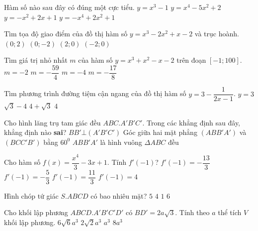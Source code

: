 \begin{ex}%
Hàm số nào sau đây có đúng một cực tiểu.
\choice
{\True$y=x^3-1$}
{$y=x^4-5x^2+2$}
{$y=-x^2+2x+1$}
{$y=-x^4+2x^2+1$}
\end{ex} 
\begin{ex}%
Tìm tọa độ giao điểm của đồ thị hàm số $y=x^3-2x^2+x-2$ và trục hoành.
\choice
{$(0;2)$}
{$(0;-2)$}
{\True$(2;0)$}
{$(-2;0)$}
\end{ex} 
\begin{ex}%
Tìm giá trị nhỏ nhất $m$ của hàm số $y=x^3+x^2-x-2$ trên đoạn $\left[ { - 1;100} \right]$.
\choice
{$m=-2$}
{\True$m=-\dfrac{59}{4}$}
{$m=-4$}
{$m=-\dfrac{17}{8}$}
\end{ex} 
\begin{ex}%
Tìm phương trình đường tiệm cận ngang của đồ thị hàm số $y=3-\dfrac{1}{2x-1}$.
\choice
{\True$y=3$}
{$\sqrt{3}-4$}
{$4+\sqrt{3}$}
{$4$}
\end{ex} 
\begin{ex}%
Cho hình lăng trụ tam giác đều $ABC.A'B'C'.$ Trong các khẳng định sau đây, khẳng định nào \textbf{sai}?
\choice
{$BB' \bot (A'B'C')$}
{Góc giữa hai mặt phẳng $(ABB'A')$ và $(BCC'B')$ bằng $60^0$}
{\True $ABB'A'$ là hình vuông}
{$\Delta ABC$ đều}
\end{ex} 
\begin{ex}%
Cho hàm số $f(x)=\dfrac{x^4}{3}-3x+1$. Tính $f'(-1)$?
\choice
{\True $f'(-1)=-\dfrac{13}{3}$}
{$f'(-1)=-\dfrac{5}{3}$}
{$f'(-1)=\dfrac{11}{3}$}
{$f'(-1)=4$}
\end{ex} 
\begin{ex}%
Hình chóp tứ giác $S.ABCD$ có bao nhiêu mặt?
\choice
{\True$5$}
{$4$}
{$1$}
{$6$}
\end{ex} 
\begin{ex}%
Cho khối lập phương $ABCD.A'B'C'D'$ có $BD'=2a\sqrt{3}$. Tính theo $a$ thể tích $V$ khối lập phương.
\choice
{$6\sqrt{6}a^3$}
{$2\sqrt{2}a^3$}
{$a^3$}
{\True$8a^3$}
\end{ex} 
